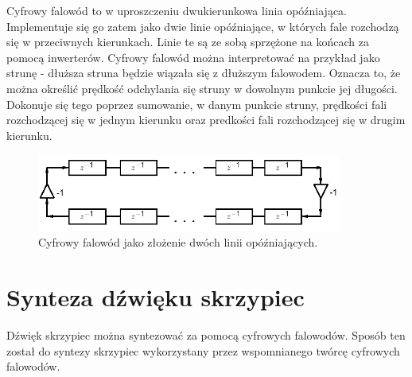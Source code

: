Cyfrowy falowód to w uproszczeniu dwukierunkowa linia opóźniająca. Implementuje się go zatem jako dwie linie opóźniające, w których fale rozchodzą się w przeciwnych kierunkach. Linie te są ze sobą sprzężone na końcach za pomocą inwerterów. Cyfrowy falowód można interpretować na przykład jako strunę - dłuższa struna będzie wiązała się z dłuższym falowodem. Oznacza to, że można określić prędkość odchylania się struny w dowolnym punkcie jej długości. Dokonuje się tego poprzez sumowanie, w danym punkcie struny, prędkości fali rozchodzącej się w jednym kierunku oraz predkości fali rozchodzącej się w drugim kierunku.
\begin{figure}[H]
	\centering
	\includegraphics[width=10cm]{grafiki/model_falowod}
	\captionsetup{justification=centering}
	\caption{Cyfrowy falowód jako złożenie dwóch linii opóźniających.}
	\label{rys:model_falowod}
\end{figure}
\section{Synteza dźwięku skrzypiec}
Dźwięk skrzypiec można syntezować za pomocą cyfrowych falowodów. Sposób ten został do syntezy skrzypiec wykorzystany przez wspomnianego twórcę cyfrowych falowodów.

